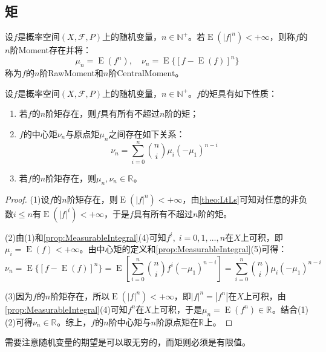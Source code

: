 \subsection{矩}
\begin{definition}
	设$f$是概率空间$(X,\mathscr{F},P)$上的随机变量，$n\in\mathbb{N}^+$。若$\operatorname{E}(|f|^n)<+\infty$，则称$f$的$n$阶\gls{Moment}存在并将：
	\begin{equation*}
		\mu_n=\operatorname{E}(f^n),\quad\nu_n=\operatorname{E}\{[f-\operatorname{E}(f)]^n\}
	\end{equation*}
	称为$f$的$n$阶\gls{RawMoment}和$n$阶\gls{CentralMoment}。
\end{definition}
\begin{property}\label{prop:Moment}
	设$f$是概率空间$(X,\mathscr{F},P)$上的随机变量，$n\in\mathbb{N}^+$。$f$的矩具有如下性质：
	\begin{enumerate}
		\item 若$f$的$n$阶矩存在，则$f$具有所有不超过$n$阶的矩；
		\item $f$的中心矩$\nu_n$与原点矩$\mu_n$之间存在如下关系：
		\begin{equation*}
			\nu_n=\sum_{i=0}^{n}\binom{n}{i}\mu_i(-\mu_1)^{n-i}
		\end{equation*}
		\item 若$f$的$n$阶矩存在，则$\mu_n,\nu_n\in\mathbb{R}^{}$。
	\end{enumerate}
\end{property}
\begin{proof}
	(1)设$f$的$n$阶矩存在，则$\operatorname{E}(|f|^n)<+\infty$，由\cref{theo:LtLs}可知对任意的非负数$i\leqslant n$有$\operatorname{E}(|f|^i)<+\infty$，于是$f$具有所有不超过$n$阶的矩。\par
	(2)由(1)和\cref{prop:MeasurableIntegral}(4)可知$f^i,\;i=0,1,\dots,n$在$X$上可积，即$\mu_i=\operatorname{E}(f)<+\infty$。由中心矩的定义和\cref{prop:MeasurableIntegral}(5)可得：
	\begin{equation*}
		\nu_n
		=\operatorname{E}\{[f-\operatorname{E}(f)]^n\}
		=\operatorname{E}\left[\sum_{i=0}^{n}\binom{n}{i}f^i(-\mu_1)^{n-i}\right]
		=\sum_{i=0}^{n}\binom{n}{i}\mu_i(-\mu_1)^{n-i}
	\end{equation*}\par
	(3)因为$f$的$n$阶矩存在，所以$\operatorname{E}(|f|^n)<+\infty$，即$|f|^n=|f^n|$在$X$上可积，由\cref{prop:MeasurableIntegral}(4)可知$f^n$在$X$上可积，于是$\mu_n=\operatorname{E}(f^n)\in\mathbb{R}^{}$。结合(1)(2)可得$\nu_n\in\mathbb{R}^{}$。综上，$f$的$n$阶中心矩与$n$阶原点矩在$\mathbb{R}^{}$上。
\end{proof}
\begin{note}
	需要注意随机变量的期望是可以取无穷的，而矩则必须是有限值。
\end{note}

